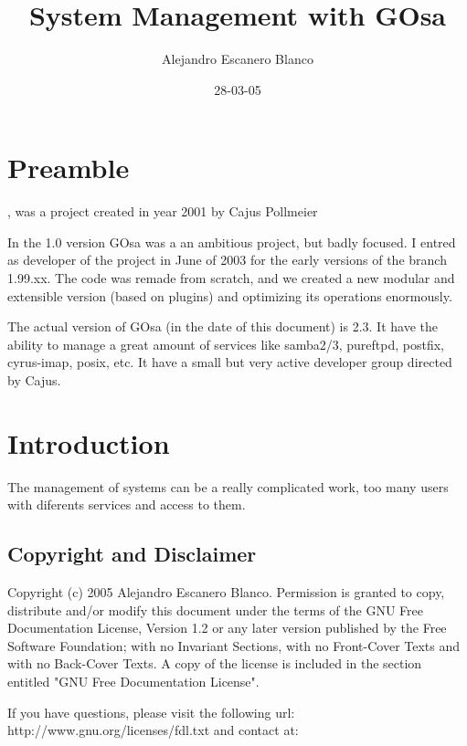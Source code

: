 \documentclass[a4paper,english,10pt]{book}
\author{Alejandro Escanero Blanco}
\title{System Management with GOsa }
\date{28-03-05}
\begin{document}
\maketitle
\newpage
\tableofcontents
\newpage
\listoffigures
\newpage
\listoftables
\newpage

\chapter*{Preamble}

, was a project created in year 2001 by Cajus Pollmeier 

In the 1.0 version GOsa was a an ambitious project, but badly focused. I entred as developer of the project in June of 2003 for the early versions of the branch 1.99.xx.
The code was remade from scratch, and we created a new modular and extensible version (based on plugins) and optimizing its operations enormously.

The actual version of GOsa (in the date of this document) is 2.3.
It have the ability to manage a great amount of services like samba2/3, pureftpd, postfix, cyrus-imap, posix, etc.
It have a small but very active developer group directed by Cajus.

\chapter{Introduction}
The management of systems can be a really complicated work, too many users with diferents services and access to them.

\section{Copyright and Disclaimer}
Copyright (c) 2005 Alejandro Escanero Blanco. Permission is granted to copy, distribute and/or modify this document under the terms of the GNU Free Documentation License, Version 1.2 or any later version published by the Free Software Foundation; with no Invariant Sections, with no Front-Cover Texts and with no Back-Cover Texts. A copy of the license is included in the section entitled "GNU Free Documentation License".

If you have questions, please visit the following url: http://www.gnu.org/licenses/fdl.txt and contact at: 


\end{document}
